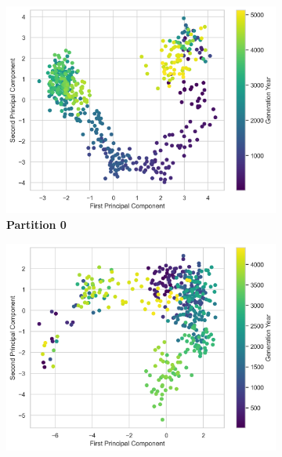 \begin{figure}[!htp]
            \begin{subfigure}{\textwidth}
                \centering
                \begin{minipage}{0.32\textwidth}
                    \centering
                    \includegraphics[width=\linewidth]{resources/partition_5_2906_3/partition_0/pca_scatterplot.png}
                    \textbf{Partition 0}
                \end{minipage}
                \hfill
                \begin{minipage}{0.32\textwidth}
                    \centering
                    \includegraphics[width=\linewidth]{resources/partition_5_2906_3/partition_1/pca_scatterplot.png}

\end{minipage}
\end{subfigure}
\end{figure}
